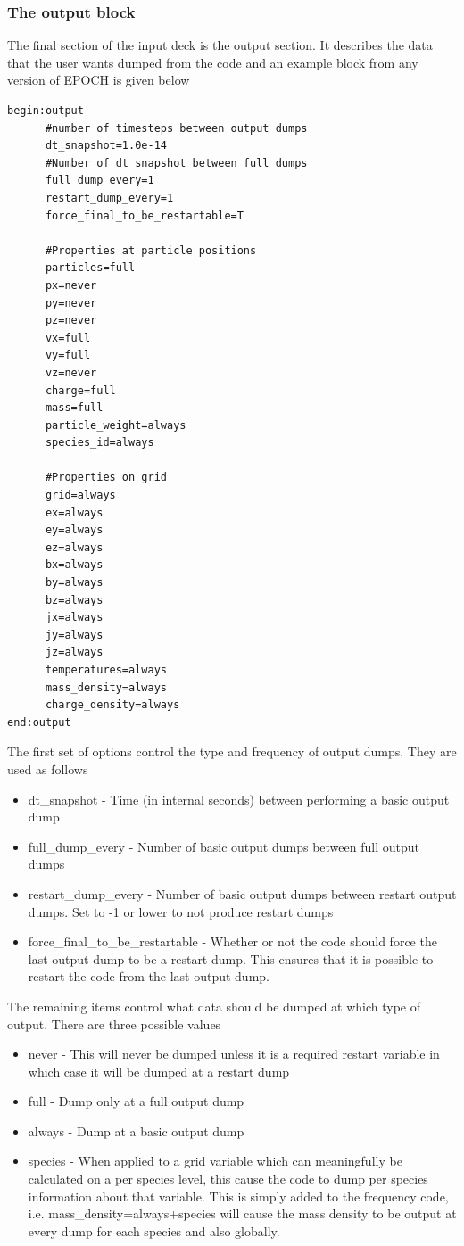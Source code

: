 \documentclass[12pt]{article}
\begin{document}
\subsubsection{The output block}
The final section of the input deck is the output section. It describes the data that the user wants dumped from the code and an example block from any version of EPOCH is given below\\
\begin{verbatim}
begin:output
      #number of timesteps between output dumps
      dt_snapshot=1.0e-14
      #Number of dt_snapshot between full dumps
      full_dump_every=1
      restart_dump_every=1
      force_final_to_be_restartable=T

      #Properties at particle positions
      particles=full
      px=never
      py=never
      pz=never
      vx=full
      vy=full
      vz=never
      charge=full
      mass=full
      particle_weight=always
      species_id=always

      #Properties on grid
      grid=always
      ex=always
      ey=always
      ez=always
      bx=always
      by=always
      bz=always
      jx=always
      jy=always
      jz=always
      temperatures=always
      mass_density=always
      charge_density=always
end:output
\end{verbatim}
The first set of options control the type and frequency of output dumps. They are used as follows\\
\begin{itemize}
\item dt\_snapshot - Time (in internal seconds) between performing a basic output dump
\item full\_dump\_every - Number of basic output dumps between full output dumps
\item restart\_dump\_every - Number of basic output dumps between restart output dumps. Set to -1 or lower to not produce restart dumps
\item force\_final\_to\_be\_restartable - Whether or not the code should force the last output dump to be a restart dump. This ensures that it is possible to restart the code from the last output dump.
\end{itemize}
The remaining items control what data should be dumped at which type of output. There are three possible values\\
\begin{itemize}
\item never - This will never be dumped unless it is a required restart variable in which case it will be dumped at a restart dump
\item full - Dump only at a full output dump
\item always - Dump at a basic output dump
\item species - When applied to a grid variable which can meaningfully be calculated on a per species level, this cause the code to dump per species information about that variable. This is simply added to the frequency code, i.e. mass\_density=always+species will cause the mass density to be output at every dump for each species and also globally.
\end{itemize}
\end{document}
